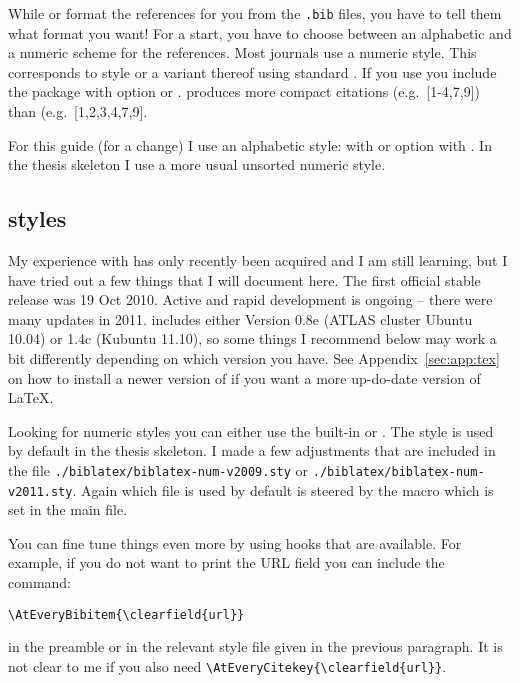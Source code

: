 While \BibTeX{} or  format the references for you
from the \texttt{.bib} files, you have to tell them what format you
want!  For a start, you have to choose between an alphabetic and a
numeric scheme for the references. Most journals use a numeric
style. This corresponds to style  or a variant thereof
using standard \BibTeX.  If you use  you include the
package with option  or
.  produces more compact
citations (e.g.\ [1-4,7,9]) than  (e.g.\
[1,2,3,4,7,9].

For this guide (for a change) I use an alphabetic style:
 with \BibTeX{} or option  with
\Package{biblatex}. In the thesis skeleton I use a more usual unsorted
numeric style.


\subsection{\Package{biblatex} styles}
\label{sec:ref:bbx}

My experience with  has only recently been acquired and I
am still learning, but I have tried out a few things that I will
document here. The first official stable release was 19 Oct
2010. Active and rapid development is ongoing -- there were many
updates in 2011.  \TeXLive 2009 includes either Version 0.8e (ATLAS
cluster Ubuntu 10.04) or 1.4c (Kubuntu 11.10), so some things I
recommend below may work a bit differently depending on which version
you have. See Appendix~\ref{sec:app:tex} on how to install a newer
version of \TeXLive if you want a more up-do-date version of \LaTeX.

Looking for numeric styles you can either use the built-in
 or .  The 
style is used by default in the thesis skeleton. I made a few
adjustments that are included in the file
\texttt{./biblatex/biblatex-num-v2009.sty} or
\texttt{./biblatex/biblatex-num-v2011.sty}. Again which file is used
by default is steered by the \Macro{texlive} macro which is set in the
main file.

You can fine tune things even more by using hooks that are
available. For example, if you do not want to print the URL field you
can include the command:
\begin{verbatim}
\AtEveryBibitem{\clearfield{url}}
\end{verbatim}
in the preamble or in the relevant style file given in the previous
paragraph. It is not clear to me if you also need
\verb+\AtEveryCitekey{\clearfield{url}}+.

